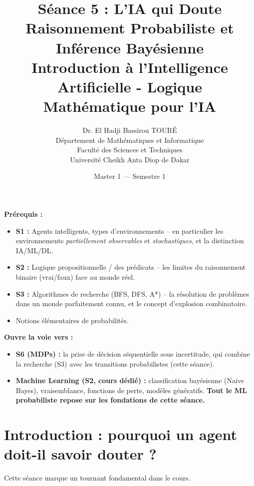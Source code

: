 \documentclass[11pt,a4paper]{article}
\title{\textbf{Séance 5 : L'IA qui Doute}\\
\large Raisonnement Probabiliste et Inférence Bayésienne\\[0.5cm]
\normalsize Introduction à l'Intelligence Artificielle - Logique Mathématique pour l'IA}
\author{Dr. El Hadji Bassirou TOURÉ\\
Département de Mathématiques et Informatique\\
Faculté des Sciences et Techniques\\
Université Cheikh Anta Diop de Dakar}
\date{Master 1 --- Semestre 1}
\begin{document}
\maketitle

\begin{prereqbox}
\textbf{Prérequis :}
\begin{itemize}[nosep]
    \item \textbf{S1 :} Agents intelligents, types d'environnements -- en particulier les environnements \textit{partiellement observables} et \textit{stochastiques}, et la distinction IA/ML/DL.
    \item \textbf{S2 :} Logique propositionnelle / des prédicats -- les limites du raisonnement binaire (vrai/faux) face au monde réel.
    \item \textbf{S3 :} Algorithmes de recherche (BFS, DFS, A*) -- la résolution de problèmes dans un monde parfaitement connu, et le concept d'explosion combinatoire.
    \item Notions élémentaires de probabilités.
\end{itemize}

\textbf{Ouvre la voie vers :}
\begin{itemize}[nosep]
    \item \textbf{S6 (MDPs) :} la prise de décision séquentielle sous incertitude, qui combine la recherche (S3) avec les transitions probabilistes (cette séance).
    \item \textbf{Machine Learning (S2, cours dédié) :} classification bayésienne (Naive Bayes), vraisemblance, fonctions de perte, modèles génératifs. \textbf{Tout le ML probabiliste repose sur les fondations de cette séance.}
\end{itemize}
\end{prereqbox}

\vspace{0.5cm}

\tableofcontents

\newpage

\section{Introduction : pourquoi un agent doit-il savoir douter ?}

Cette séance marque un tournant fondamental dans le cours.
\end{document}
